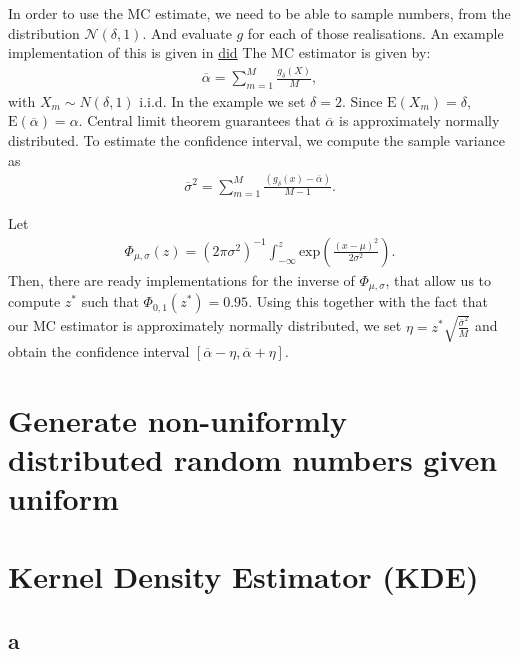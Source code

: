 \documentclass[a4paper,11pt]{article}
\newcommand{\expf}[1]{\mathrm{exp}\left ( {#1}\right )}
\newcommand{\parent}[1]{\left( {#1} \right)}
\newcommand{\ssum}[2]{\displaystyle\sum\limits_{#1}^{#2}}
\newcommand{\expp}[1]{\mathrm{E} \parent{{#1}}}
\begin{document}
In order to use the MC estimate, we need to be able to sample numbers, from
the distribution $\mathcal N \parent{\delta,1}$. And evaluate $g$ for each of those realisations.
An example implementation of this is given in \url{did}
The MC estimator is given by:
\begin{align}
\overline \alpha = \ssum{m =1}{M} \frac{g_\delta \parent{X}}{M},
\end{align}
with $X_m \sim  N \parent{\delta,1}$ i.i.d. In the example we set $\delta=2$.
Since $\expp{X_m} = \delta$, $\expp{\overline \alpha} = \alpha$. Central
limit theorem guarantees that $\overline \alpha$ is approximately normally
distributed. To estimate the confidence interval, we compute the sample variance
as
\begin{align}
\overline \sigma^2 = \ssum{m=1}{M} \frac{\parent{g_\delta \parent{x}- \overline \alpha}}{M-1}.
\end{align}

Let
\begin{align}
\Phi_{\mu,\sigma} \parent{z} = \parent{ 2 \pi \sigma^2}^{-1}  \int_{-\infty}^z \expf{\frac{\parent{x-\mu}^2}{2 \sigma^2}}.
\end{align}
Then, there are ready implementations for the inverse of $\Phi_{\mu,\sigma}$, that
allow us to compute $z^*$ such that $\Phi_{0,1} \parent{z^*} = 0.95$. Using this
together with the fact that our MC estimator is approximately normally distributed,
we set $\eta = z^* \sqrt{\frac{\overline \sigma^2}{M}}$ and obtain the confidence interval
$[\overline \alpha - \eta, \overline \alpha + \eta]$.


\section*{Generate non-uniformly distributed random numbers given uniform}

\section*{Kernel Density Estimator (KDE)}

\subsection*{a}
\end{document}

